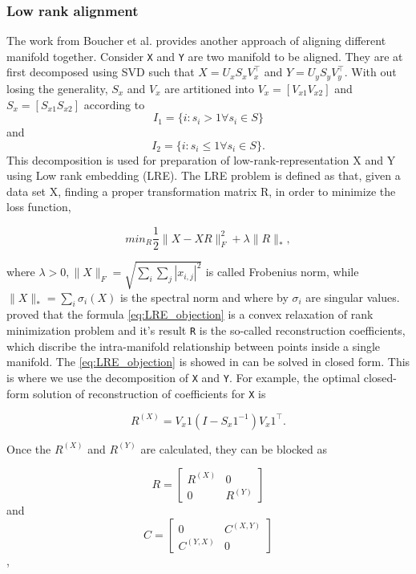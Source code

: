 \documentclass[11pt,a4paper]{article}
\begin{document}
  \subsubsection{Low rank alignment}
  The work from Boucher et al. \cite{boucher2015aligning} provides another approach of aligning different manifold together. Consider \verb|X| and \verb|Y| are two manifold to be aligned. They are at first decomposed using SVD such that $X=U_xS_xV_x^\intercal$ and $Y=U_yS_yV_y^\intercal$. With out losing the generality, $S_x$ and $V_x$ are artitioned into $V_x=[V_{x1}V_{x2}]$ and $S_x=[S_{x1}S_{x2}]$ according to 
  $$
  I_1=\{i:s_i>1 \forall s_i \in S\}
  $$
  and
  $$
  I_2=\{i:s_i\leq 1 \forall s_i\in S\}.
  $$ 
  This decomposition is used for preparation of low-rank-representation X and Y using Low rank embedding (LRE). The LRE problem is defined as that, given a data set X, finding a proper transformation matrix R, in order to minimize the loss function,

  \begin{equation}\label{eq:LRE_objection}
  min_R\frac{1}{2}\|X-XR\|^2_F+\lambda\|R\|_*,
  \end{equation}

  where $\lambda > 0, \|X\|_F=\sqrt{\sum_i\sum_j|x_{i,j}|^2}$ is called Frobenius norm, while $\|X\|_*=\sum_i\sigma_i(X)$ is the spectral norm and where by $\sigma_i$ are singular values. \cite{candes2010power} proved that the formula \eqref{eq:LRE_objection} is a convex relaxation of rank minimization problem and it's result \verb|R| is the so-called reconstruction coefficients, which discribe the intra-manifold relationship between points inside a single manifold. The \eqref{eq:LRE_objection} is showed in \cite{favaro2011closed} can be solved in closed form. This is where we use the decomposition of \verb|X| and \verb|Y|. For example, the optimal closed-form solution of reconstruction of coefficients for \verb|X| is
  
  \begin{equation}
  R^{(X)}=V_x1(I-S_x1^{-1})V_x1^\intercal.
  \end{equation}

  Once the $R^{(X)}$ and $R^{(Y)}$ are calculated, they can be blocked as
  
  \[R= \begin{bmatrix}
      R^{(X)} & 0 \\
      0 & R^{(Y)}
      \end{bmatrix}\] and 
  \[C=\begin{bmatrix}
      0 & C^{(X,Y)}\\
      C^{(Y,X)} & 0
      \end{bmatrix}\],
\end{document}
